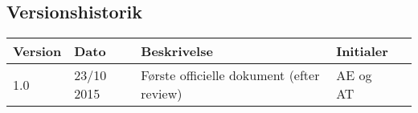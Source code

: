 \subsection{Versionshistorik}

\begin{center}
		\begin{longtable}{ | m{2.5cm} | m{2.5cm}| m{2.5cm}| m{2.5cm}| m{2.5cm}| } 
			\hline
			\textbf{Version} & \textbf{Dato} &  \textbf{Beskrivelse} & \textbf{Initialer}  \\ 
			\hline
			1.0  & 23/10 2015 & Første officielle dokument (efter review) & AE og AT \\
			\hline
		\end{longtable}	
	\end{center}